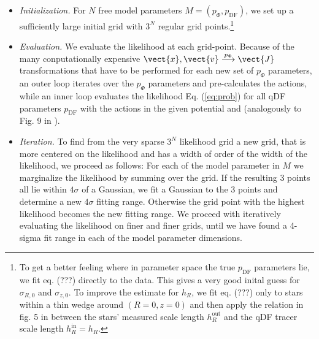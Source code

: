 \begin{itemize}

\item \emph{Initialization.} For $N$ free model parameters $M=(p_\Phi,p_\text{DF})$, we set up a sufficiently large initial grid with $3^N$ regular grid points.\footnote{To get a better feeling where in parameter space the true $p_\text{DF}$ parameters lie, we fit eq. (???) directly to the data. This gives a very good inital guess for $\sigma_{R,0}$ and $\sigma_{z,0}$. To improve the estimate for $h_R$, we fit eq. (???) only to stars within a thin wedge around $(R=0,z=0)$ and then apply the relation in fig. 5 in \citet{bov13} between the stars' measured scale length $h_R^\text{out}$ and the qDF tracer scale length $h_R^\text{in}=h_R$.}

\item  \emph{Evaluation.} We evaluate the likelihood at each grid-point. Because of the many conputationally expensive $\vect{x},\vect{v} \overset{p_\Phi}{\longrightarrow} \vect{J}$ transformations that have to be performed for each new set of $p_\Phi$ parameters, an outer loop iterates over the $p_\Phi$ parameters and pre-calculates the actions, while an inner loop evaluates the likelihood Eq. (\ref{eq:prob}) for all qDF parameters $p_\text{DF}$ with the actions in the given potential and (analogously to Fig. 9 in \citet{bov13}).

\item \emph{Iteration.} To find from the very sparse $3^N$ likelihood grid a new grid, that is more centered on the likelihood and has a width of order of the width of the likelihood, we proceed as follows: For each of the model parameter in $M$ we marginalize the likelihood by summing over the grid. If the resulting 3 points all lie within $4\sigma$ of a Gaussian, we fit a Gaussian to the 3 points and determine a new $4\sigma$ fitting range. Otherwise the grid point with the highest likelihood becomes the new fitting range. We proceed with iteratively evaluating the likelihood on finer and finer grids, until we have found a 4-sigma fit range in each of the model parameter dimensions.


\end{itemize}
